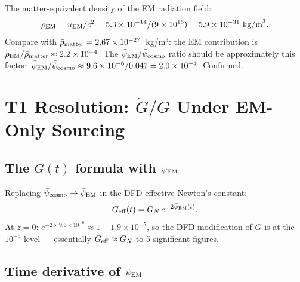 \documentclass[11pt]{article}
\newcommand{\ee}[1]{\times 10^{#1}}
\newcommand{\psicosmo}{\bar{\psi}_{\rm cosmo}}
\newcommand{\psiEM}{\bar{\psi}_{\rm EM}}
\newcommand{\GN}{G_N}
\newcommand{\Geff}{G_{\rm eff}}
\newcommand{\Gdot}{\dot{G}/G}
\begin{document}
The matter-equivalent density of the EM radiation field:
\begin{equation}
  \rho_{\rm EM} = u_{\rm EM}/c^2 = 5.3\ee{-14}/(9\ee{16})
  = 5.9\ee{-31}~\text{kg/m}^3.
\end{equation}
Compare with $\bar\rho_{\rm matter} = 2.67\ee{-27}$~kg/m$^3$: the EM
contribution is $\rho_{\rm EM}/\bar\rho_{\rm matter} \approx 2.2\ee{-4}$.
The $\psiEM/\psicosmo$ ratio should be approximately this factor:
$\psiEM/\psicosmo \approx 9.6\ee{-6}/0.047 = 2.0\ee{-4}$. Confirmed.

\section{T1 Resolution: $\Gdot$ Under EM-Only Sourcing}
\label{sec:T1-resolution}

\subsection{The $G(t)$ formula with $\psiEM$}

Replacing $\psicosmo \to \psiEM$ in the DFD effective Newton's constant:
\begin{equation}\label{eq:Geff-EM}
  \Geff(t) = \GN\,e^{-2\psiEM(t)}.
\end{equation}
At $z = 0$: $e^{-2\times 9.6\ee{-6}} \approx 1 - 1.9\ee{-5}$, so
the DFD modification of $G$ is at the $10^{-5}$ level --- essentially
$\Geff \approx \GN$ to 5 significant figures.

\subsection{Time derivative of $\psiEM$}
\end{document}
